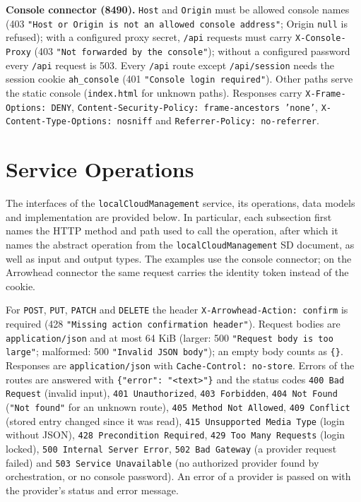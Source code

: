 \documentclass[a4paper]{arrowhead}
\begin{document}
\textbf{Console connector (8490).} \texttt{Host} and \texttt{Origin} must be allowed console names (403 \texttt{"Host or Origin is not an allowed console address"}; Origin \texttt{null} is refused); with a configured proxy secret, \texttt{/api} requests must carry \texttt{X-\allowbreak{}Console-\allowbreak{}Proxy} (403 \texttt{"Not forwarded by the console"}); without a configured password every \texttt{/api} request is 503. Every \texttt{/api} route except \texttt{/api/\allowbreak{}session} needs the session cookie \texttt{ah\_\allowbreak{}console} (401 \texttt{"Console login required"}). Other paths serve the static console (\texttt{index.html} for unknown paths). Responses carry \texttt{X-\allowbreak{}Frame-\allowbreak{}Options:\allowbreak{} DENY}, \texttt{Content-\allowbreak{}Security-\allowbreak{}Policy:\allowbreak{} frame-\allowbreak{}ancestors 'none'}, \texttt{X-\allowbreak{}Content-\allowbreak{}Type-\allowbreak{}Options:\allowbreak{} nosniff} and \texttt{Referrer-\allowbreak{}Policy:\allowbreak{} no-\allowbreak{}referrer}.

\newpage

\section{Service Operations}
\label{sec:operations}

The interfaces of the \texttt{local\allowbreak{}Cloud\allowbreak{}Management} service, its operations, data models and implementation are provided below.
In particular, each subsection first names the HTTP method and path used to call the operation, after which it names the abstract operation from the \texttt{local\allowbreak{}Cloud\allowbreak{}Management} SD document, as well as input and output types. The examples use the console connector; on the Arrowhead connector the same request carries the identity token instead of the cookie.

For \texttt{POST}, \texttt{PUT}, \texttt{PATCH} and \texttt{DELETE} the header \texttt{X-Arrowhead-Action: confirm} is required (428 \texttt{"Missing action confirmation header"}). Request bodies are \texttt{application/json} and at most 64 KiB (larger: 500 \texttt{"Request body is too large"}; malformed: 500 \texttt{"Invalid JSON body"}); an empty body counts as \texttt{\{\}}. Responses are \texttt{application/json} with \texttt{Cache-Control: no-store}.
Errors of the routes are answered with \texttt{\{"error": "<text>"\}} and the status codes \texttt{400 Bad Request} (invalid input), \texttt{401 Unauthorized}, \texttt{403 Forbidden}, \texttt{404 Not Found} (\texttt{"Not found"} for an unknown route), \texttt{405 Method Not Allowed}, \texttt{409 Conflict} (stored entry changed since it was read), \texttt{415 Unsupported Media Type} (login without JSON), \texttt{428 Precondition Required}, \texttt{429 Too Many Requests} (login locked), \texttt{500 Internal Server Error}, \texttt{502 Bad Gateway} (a provider request failed) and \texttt{503 Service Unavailable} (no authorized provider found by orchestration, or no console password). An error of a provider is passed on with the provider's status and error message.
\end{document}
